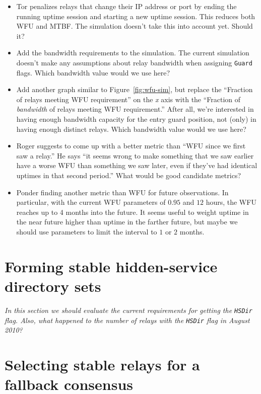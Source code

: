 \documentclass{article}
\begin{document}
{\it
\begin{itemize}
\item Tor penalizes relays that change their IP address or port by ending
the running uptime session and starting a new uptime session.  This
reduces both WFU and MTBF.  The simulation doesn't take this into account
yet.  Should it?
\item Add the bandwidth requirements to the simulation.  The current
simulation doesn't make any assumptions about relay bandwidth when
assigning \texttt{Guard} flags.  Which bandwidth value would we use here?
\item Add another graph similar to Figure~\ref{fig:wfu-sim}, but replace
the ``Fraction of relays meeting WFU requirement'' on the \emph{x} axis
with the ``Fraction of \emph{bandwidth} of relays meeting WFU
requirement.''
After all, we're interested in having enough bandwidth capacity for the
entry guard position, not (only) in having enough distinct relays.
Which bandwidth value would we use here?
\item Roger suggests to come up with a better metric than ``WFU since we
first saw a relay.''
He says ``it seems wrong to make something that we saw earlier have a
worse WFU than something we saw later, even if they've had identical
uptimes in that second period.''
What would be good candidate metrics?
\item Ponder finding another metric than WFU for future observations.  In
particular, with the current WFU parameters of $0.95$ and $12$ hours, the
WFU reaches up to 4 months into the future.  It seems useful to weight
uptime in the near future higher than uptime in the farther future, but
maybe we should use parameters to limit the interval to $1$ or $2$ months.
\end{itemize}
}

\section{Forming stable hidden-service directory sets}

{\it
In this section we should evaluate the current requirements for getting
the \texttt{HSDir} flag.
Also, what happened to the number of relays with the \texttt{HSDir} flag
in August 2010?
}

\section{Selecting stable relays for a fallback consensus}
\end{document}
